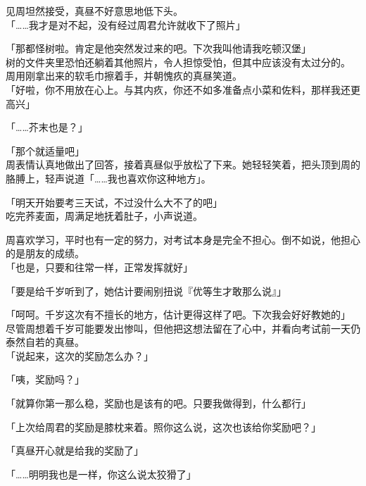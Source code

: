 见周坦然接受，真昼不好意思地低下头。\\

「……我才是对不起，没有经过周君允许就收下了照片」

「那都怪树啦。肯定是他突然发过来的吧。下次我叫他请我吃顿汉堡」\\

树的文件夹里恐怕还躺着其他照片，令人担惊受怕，但其中应该没有太过分的。\\

周用刚拿出来的软毛巾擦着手，并朝愧疚的真昼笑道。\\

「好啦，你不用放在心上。与其内疚，你还不如多准备点小菜和佐料，那样我还更高兴」

「……芥末也是？」

「那个就适量吧」\\

周表情认真地做出了回答，接着真昼似乎放松了下来。她轻轻笑着，把头顶到周的胳膊上，轻声说道「……我也喜欢你这种地方」。\\

\vspace{2\baselineskip}

「明天开始要考三天试，不过没什么大不了的吧」\\

吃完荞麦面，周满足地抚着肚子，小声说道。

周喜欢学习，平时也有一定的努力，对考试本身是完全不担心。倒不如说，他担心的是朋友的成绩。\\

「也是，只要和往常一样，正常发挥就好」

「要是给千岁听到了，她估计要闹别扭说『优等生才敢那么说』」

「呵呵。千岁这次有不擅长的地方，估计更得这样了吧。下次我会好好教她的」\\

尽管周想着千岁可能要发出惨叫，但他把这想法留在了心中，并看向考试前一天仍泰然自若的真昼。\\

「说起来，这次的奖励怎么办？」

「咦，奖励吗？」

「就算你第一那么稳，奖励也是该有的吧。只要我做得到，什么都行」

「上次给周君的奖励是膝枕来着。照你这么说，这次也该给你奖励吧？」

「真昼开心就是给我的奖励了」

「……明明我也是一样，你这么说太狡猾了」\\

